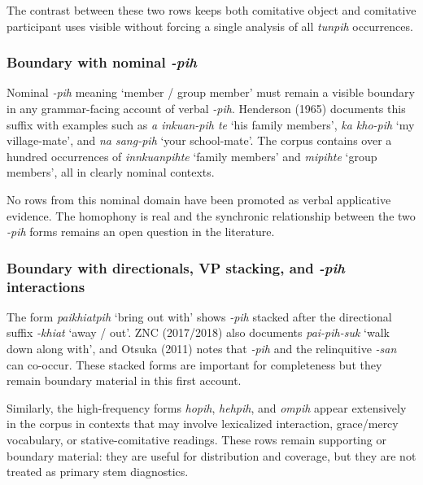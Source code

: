 \documentclass[
  11pt,
  a4paper,
]{article}
\newcommand{\tdim}[1]{\textit{#1}}
\newcommand{\glossquote}[1]{`#1'}
\begin{document}
The contrast between these two rows keeps both comitative object and
comitative participant uses visible without forcing a single analysis of
all \tdim{tunpih} occurrences.

\subsubsection{\texorpdfstring{Boundary with nominal
\tdim{-pih}}{Boundary with nominal }}\label{boundary-with-nominal}

Nominal \tdim{-pih} meaning \glossquote{member / group member} must
remain a visible boundary in any grammar-facing account of verbal
\tdim{-pih}. Henderson (1965) documents this suffix with examples such
as \tdim{a inkuan-pih te} \glossquote{his family members},
\tdim{ka kho-pih} \glossquote{my village-mate}, and \tdim{na sang-pih}
\glossquote{your school-mate}. The corpus contains over a hundred
occurrences of \tdim{innkuanpihte} \glossquote{family members} and
\tdim{mipihte} \glossquote{group members}, all in clearly nominal
contexts.

No rows from this nominal domain have been promoted as verbal
applicative evidence. The homophony is real and the synchronic
relationship between the two \tdim{-pih} forms remains an open question
in the literature.

\subsubsection{\texorpdfstring{Boundary with directionals, VP stacking,
and \tdim{-pih}
interactions}{Boundary with directionals, VP stacking, and  interactions}}\label{boundary-with-directionals-vp-stacking-and-interactions}

The form \tdim{paikhiatpih} \glossquote{bring out with} shows
\tdim{-pih} stacked after the directional suffix \tdim{-khiat}
\glossquote{away / out}. ZNC (2017/2018) also documents
\tdim{pai-pih-suk} \glossquote{walk down along with}, and Otsuka (2011)
notes that \tdim{-pih} and the relinquitive \tdim{-san} can co-occur.
These stacked forms are important for completeness but they remain
boundary material in this first account.

Similarly, the high-frequency forms \tdim{hopih}, \tdim{hehpih}, and
\tdim{ompih} appear extensively in the corpus in contexts that may
involve lexicalized interaction, grace/mercy vocabulary, or
stative-comitative readings. These rows remain supporting or boundary
material: they are useful for distribution and coverage, but they are
not treated as primary stem diagnostics.
\end{document}
